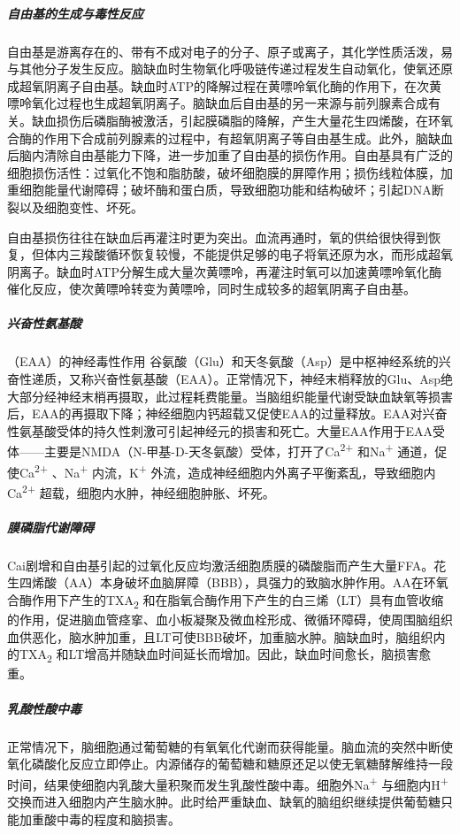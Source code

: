 \subparagraph{自由基的生成与毒性反应}

自由基是游离存在的、带有不成对电子的分子、原子或离子，其化学性质活泼，易与其他分子发生反应。脑缺血时生物氧化呼吸链传递过程发生自动氧化，使氧还原成超氧阴离子自由基。缺血时ATP的降解过程在黄嘌呤氧化酶的作用下，在次黄嘌呤氧化过程也生成超氧阴离子。脑缺血后自由基的另一来源与前列腺素合成有关。缺血损伤后磷脂酶被激活，引起膜磷脂的降解，产生大量花生四烯酸，在环氧合酶的作用下合成前列腺素的过程中，有超氧阴离子等自由基生成。此外，脑缺血后脑内清除自由基能力下降，进一步加重了自由基的损伤作用。自由基具有广泛的细胞损伤活性：过氧化不饱和脂肪酸，破坏细胞膜的屏障作用；损伤线粒体膜，加重细胞能量代谢障碍；破坏酶和蛋白质，导致细胞功能和结构破坏；引起DNA断裂以及细胞变性、坏死。

自由基损伤往往在缺血后再灌注时更为突出。血流再通时，氧的供给很快得到恢复，但体内三羧酸循环恢复较慢，不能提供足够的电子将氧还原为水，而形成超氧阴离子。缺血时ATP分解生成大量次黄嘌呤，再灌注时氧可以加速黄嘌呤氧化酶催化反应，使次黄嘌呤转变为黄嘌呤，同时生成较多的超氧阴离子自由基。

\subparagraph{兴奋性氨基酸}

（EAA）的神经毒性作用
谷氨酸（Glu）和天冬氨酸（Asp）是中枢神经系统的兴奋性递质，又称兴奋性氨基酸（EAA）。正常情况下，神经末梢释放的Glu、Asp绝大部分经神经末梢再摄取，此过程耗费能量。当脑组织能量代谢受缺血缺氧等损害后，EAA的再摄取下降；神经细胞内钙超载又促使EAA的过量释放。EAA对兴奋性氨基酸受体的持久性刺激可引起神经元的损害和死亡。大量EAA作用于EAA受体------主要是NMDA（N-甲基-D-天冬氨酸）受体，打开了Ca\textsuperscript{2+}
和Na\textsuperscript{+} 通道，促使Ca\textsuperscript{2+}
、Na\textsuperscript{+} 内流，K\textsuperscript{+}
外流，造成神经细胞内外离子平衡紊乱，导致细胞内Ca\textsuperscript{2+}
超载，细胞内水肿，神经细胞肿胀、坏死。

\subparagraph{膜磷脂代谢障碍}

Cai剧增和自由基引起的过氧化反应均激活细胞质膜的磷酸脂而产生大量FFA。花生四烯酸（AA）本身破坏血脑屏障（BBB），具强力的致脑水肿作用。AA在环氧合酶作用下产生的TXA\textsubscript{2}
和在脂氧合酶作用下产生的白三烯（LT）具有血管收缩的作用，促进脑血管痉挛、血小板凝聚及微血栓形成、微循环障碍，使周围脑组织血供恶化，脑水肿加重，且LT可使BBB破坏，加重脑水肿。脑缺血时，脑组织内的TXA\textsubscript{2}
和LT增高并随缺血时间延长而增加。因此，缺血时间愈长，脑损害愈重。

\subparagraph{乳酸性酸中毒}

正常情况下，脑细胞通过葡萄糖的有氧氧化代谢而获得能量。脑血流的突然中断使氧化磷酸化反应立即停止。内源储存的葡萄糖和糖原还足以使无氧糖酵解维持一段时间，结果使细胞内乳酸大量积聚而发生乳酸性酸中毒。细胞外Na\textsuperscript{+}
与细胞内H\textsuperscript{+}
交换而进入细胞内产生脑水肿。此时给严重缺血、缺氧的脑组织继续提供葡萄糖只能加重酸中毒的程度和脑损害。

